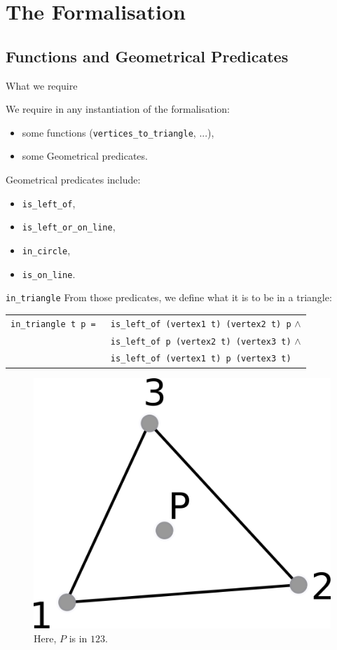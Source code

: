 \documentclass[18pt]{beamer}
\begin{document}
\section{The Formalisation}


\subsection{Functions and Geometrical Predicates}

\begin{frame}{What we require}
 
 We require in any instantiation of the formalisation:
 \begin{itemize}
  \item some functions ({\tt vertices\_to\_triangle}, ...),
  \item some Geometrical predicates.
 \end{itemize}
Geometrical predicates include:
\begin{itemize}
 \item<2-> {\tt is\_left\_of},
 \item<3-> {\tt is\_left\_or\_on\_line},
 \item<4-> {\tt in\_circle},
  \item<5-> {\tt is\_on\_line}.
\end{itemize}
\end{frame}
\begin{frame}{\tt in\_triangle}
From those predicates, we define what it is to be in a triangle:
{\small \begin{tabular}{ll}
       {\tt in\_triangle t p = }& {\tt is\_left\_of (vertex1 t) (vertex2 t) p} $\wedge$\\
        &{\tt is\_left\_of p (vertex2 t) (vertex3 t)} $\wedge$\\
  & {\tt is\_left\_of (vertex1 t) p (vertex3 t)}
      \end{tabular}}
      
       \begin{figure}
  \centering
  \includegraphics[scale=1]{intriangle}
  \caption{Here, $P$ is in $123$.}
\end{figure}
\end{frame}
\end{document}
